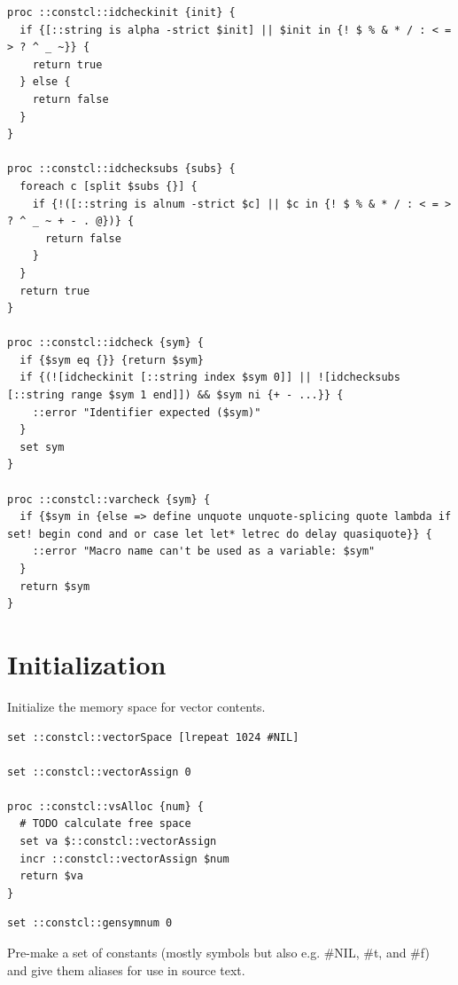 \documentclass[twoside,9pt]{report}
\begin{document}
\noindent\makebox[\linewidth]{\rule{\linewidth}{0.4pt}}
\begin{lstlisting}
proc ::constcl::idcheckinit {init} {
  if {[::string is alpha -strict $init] || $init in {! $ % & * / : < = > ? ^ _ ~}} {
    return true
  } else {
    return false
  }
}
 
proc ::constcl::idchecksubs {subs} {
  foreach c [split $subs {}] {
    if {!([::string is alnum -strict $c] || $c in {! $ % & * / : < = > ? ^ _ ~ + - . @})} {
      return false
    }
  }
  return true
}
 
proc ::constcl::idcheck {sym} {
  if {$sym eq {}} {return $sym}
  if {(![idcheckinit [::string index $sym 0]] || ![idchecksubs [::string range $sym 1 end]]) && $sym ni {+ - ...}} {
    ::error "Identifier expected ($sym)"
  }
  set sym
}
 
proc ::constcl::varcheck {sym} {
  if {$sym in {else => define unquote unquote-splicing quote lambda if set! begin cond and or case let let* letrec do delay quasiquote}} {
    ::error "Macro name can't be used as a variable: $sym"
  }
  return $sym
}
\end{lstlisting}
\noindent\makebox[\linewidth]{\rule{\linewidth}{0.4pt}}
\chapter{Initialization}
\label{initialization}

Initialize the memory space for vector contents.

\noindent\makebox[\linewidth]{\rule{\linewidth}{0.4pt}}
\begin{lstlisting}
set ::constcl::vectorSpace [lrepeat 1024 #NIL]
 
set ::constcl::vectorAssign 0
 
proc ::constcl::vsAlloc {num} {
  # TODO calculate free space
  set va $::constcl::vectorAssign
  incr ::constcl::vectorAssign $num
  return $va
}
\end{lstlisting}
\noindent\makebox[\linewidth]{\rule{\linewidth}{0.4pt}}
\noindent\makebox[\linewidth]{\rule{\linewidth}{0.4pt}}
\begin{lstlisting}
set ::constcl::gensymnum 0
\end{lstlisting}
\noindent\makebox[\linewidth]{\rule{\linewidth}{0.4pt}}

Pre-make a set of constants (mostly symbols but also e.g. \#NIL, \#t, and \#f) and give them aliases for use in source text.
\end{document}
